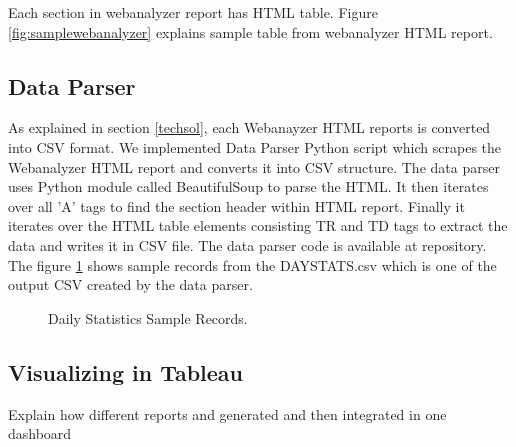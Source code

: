  Each section in webanalyzer report has HTML table. Figure
 \ref{fig:samplewebanalyzer} explains sample table from webanalyzer HTML
 report.


\subsection{Data Parser} \label{dataparser}
As explained in section \ref{techsol}, each Webanayzer HTML reports is
converted into CSV format. We implemented Data Parser Python script which
scrapes the
Webanalyzer HTML report and converts it into CSV structure. The data parser
uses Python module called BeautifulSoup to parse the HTML. It then iterates
over all 'A' tags to find the section header within HTML report. Finally it
iterates over the HTML table elements consisting TR and TD tags to extract
the data and writes it in CSV file.
 The data parser code is available at \cite{dataparser} repository. The
 figure \ref{fig:daystats} shows sample records from the DAYSTATS.csv which
 is one of the output CSV created by the data parser.

 \begin{figure}[daystats]
\centering
{}
\caption{Daily Statistics Sample Records.}
\label{fig:daystats}
\end{figure}

\subsection{Visualizing in Tableau}
Explain how different reports and generated and then integrated in one dashboard




